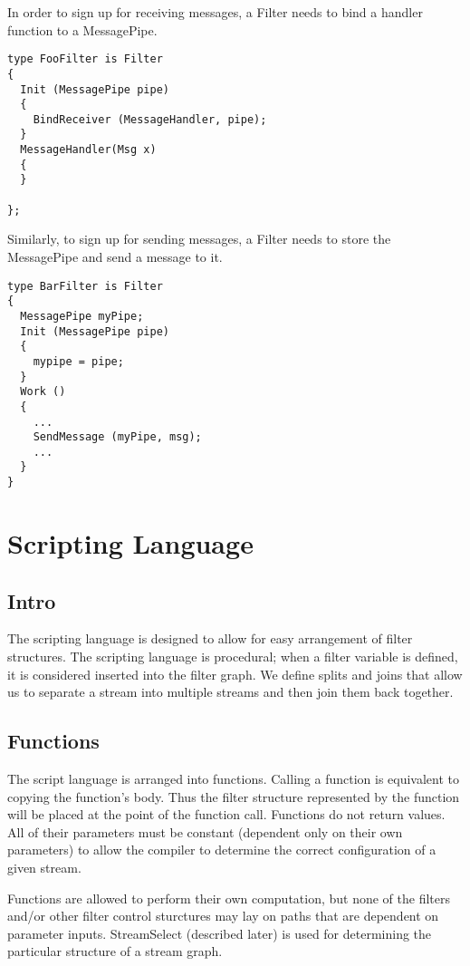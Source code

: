 \documentclass[twocolumn, draft]{article}
\begin{document}
In order to sign up for receiving messages, a Filter needs to bind a
handler function to a MessagePipe.

\begin{verbatim}
type FooFilter is Filter
{
  Init (MessagePipe pipe)
  {
    BindReceiver (MessageHandler, pipe);
  }
  MessageHandler(Msg x)
  {
  }

};
\end{verbatim}

Similarly, to sign up for sending messages, a Filter needs to store the
MessagePipe and send a message to it.

\begin{verbatim}
type BarFilter is Filter
{
  MessagePipe myPipe;
  Init (MessagePipe pipe)
  {
    mypipe = pipe;
  }
  Work ()
  {
    ...
    SendMessage (myPipe, msg);
    ...
  }
}
\end{verbatim}

\section{Scripting Language}

\subsection{Intro}

The scripting language is designed to allow for easy arrangement of 
filter structures.  The scripting language is procedural;  when a filter
variable is defined, it is considered inserted into the filter graph.
We define splits and joins that allow us to separate a stream into multiple
streams and then join them back together.

\subsection{Functions}

The script language is arranged into functions.  Calling a function is
equivalent to copying the function's body.  Thus the filter structure 
represented by the function will be placed at the point of the function
call.  Functions do not return values.  All of their parameters must
be constant (dependent only on their own parameters) to allow the compiler 
to determine the correct configuration of a given stream.

Functions are allowed to perform their own computation, but none of the
filters and/or other filter control sturctures may lay on paths that are
dependent on parameter inputs.  StreamSelect (described later) is used
for determining the particular structure of a stream graph.
\end{document}
